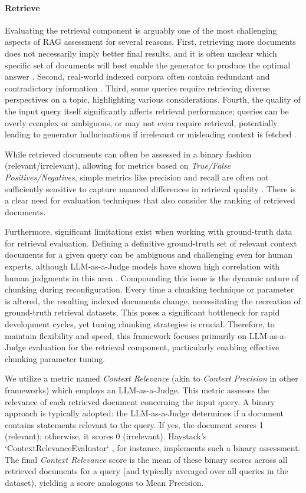 \paragraph{Retrieve}
Evaluating the retrieval component is arguably one of the most challenging aspects of RAG assessment for several reasons. First, retrieving more documents does not necessarily imply better final results, and it is often unclear which specific set of documents will best enable the generator to produce the optimal answer \cite{Jin.5222024}. Second, real-world indexed corpora often contain redundant and contradictory information \cite{Yu.2024}. Third, some queries require retrieving diverse perspectives on a topic, highlighting various considerations. Fourth, the quality of the input query itself significantly affects retrieval performance; queries can be overly complex or ambiguous, or may not even require retrieval, potentially leading to generator hallucinations if irrelevant or misleading context is fetched \cite{Huang_2023, Mallen.2022}.

While retrieved documents can often be assessed in a binary fashion (relevant/irrelevant), allowing for metrics based on \textit{True/False Positives/Negatives}, simple metrics like precision and recall are often not sufficiently sensitive to capture nuanced differences in retrieval quality \cite{Yu.2024}. There is a clear need for evaluation techniques that also consider the ranking of retrieved documents.

Furthermore, significant limitations exist when working with ground-truth data for retrieval evaluation. Defining a definitive ground-truth set of relevant context documents for a given query can be ambiguous and challenging even for human experts, although LLM-as-a-Judge models have shown high correlation with human judgments in this area \cite{Chiang.2023}. Compounding this issue is the dynamic nature of chunking during reconfiguration. Every time a chunking technique or parameter is altered, the resulting indexed documents change, necessitating the recreation of ground-truth retrieval datasets. This poses a significant bottleneck for rapid development cycles, yet tuning chunking strategies is crucial. Therefore, to maintain flexibility and speed, this framework focuses primarily on LLM-as-a-Judge evaluation for the retrieval component, particularly enabling effective chunking parameter tuning.

We utilize a metric named \textit{Context Relevance} (akin to \textit{Context Precision} in other frameworks) which employs an LLM-as-a-Judge. This metric assesses the relevance of each retrieved document concerning the input query. A binary approach is typically adopted: the LLM-as-a-Judge determines if a document contains statements relevant to the query. If yes, the document scores 1 (relevant); otherwise, it scores 0 (irrelevant). Haystack's `ContextRelevanceEvaluator` \cite{Pietsch_Haystack_the_end-to-end_2019}, for instance, implements such a binary assessment. The final \textit{Context Relevance} score is the mean of these binary scores across all retrieved documents for a query (and typically averaged over all queries in the dataset), yielding a score analogous to Mean Precision. 

